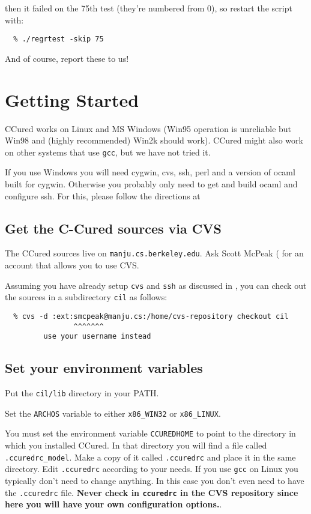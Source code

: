 \documentclass{book}
\def\t#1{{\tt #1}}
\begin{document}
then it failed on the 75th test (they're numbered from 0), so restart
the script with:

\begin{verbatim}
  % ./regrtest -skip 75
\end{verbatim}

And of course, report these to us!


        \chapter{Getting Started}\label{ch-start}

 CCured works on Linux and MS Windows (Win95 operation is unreliable but Win98
and (highly recommended) Win2k should work). CCured might also work on other
systems that use \t{gcc}, but we have not tried it.

 If you use Windows you will need cygwin, cvs, ssh, perl and a version of
ocaml built for cygwin. Otherwise you probably only need to get and build
ocaml and configure ssh. For this, please follow the directions at


\section{Get the C-Cured sources via CVS}

 The CCured sources live on \t{manju.cs.berkeley.edu}. Ask Scott McPeak
( for an account that allows you to use CVS. 

 Assuming you have already setup \t{cvs} and \t{ssh} as discussed in
, you can check out the sources in a subdirectory \t{cil}
as follows:

\begin{verbatim}
  % cvs -d :ext:smcpeak@manju.cs:/home/cvs-repository checkout cil
                ^^^^^^^
         use your username instead
\end{verbatim}

\section{Set your environment variables}

 Put the \t{cil/lib} directory in your PATH.

 Set the \t{ARCHOS} variable to either \t{x86\_WIN32} or \t{x86\_LINUX}.

 You must set the environment variable \t{CCUREDHOME} to point to the
directory in which you installed CCured. In that directory you will find a
file called \t{.ccuredrc\_model}. Make a copy of it called \t{.ccuredrc} and
place it in the same directory. Edit \t{.ccuredrc} according to your needs. If
you use \t{gcc} on Linux you typically don't need to change anything. In this
case you don't even need to have the \t{.ccuredrc} file. {\bf Never check in
\t{ccuredrc} in the CVS repository since here you will have your own
configuration options.}.
\end{document}
